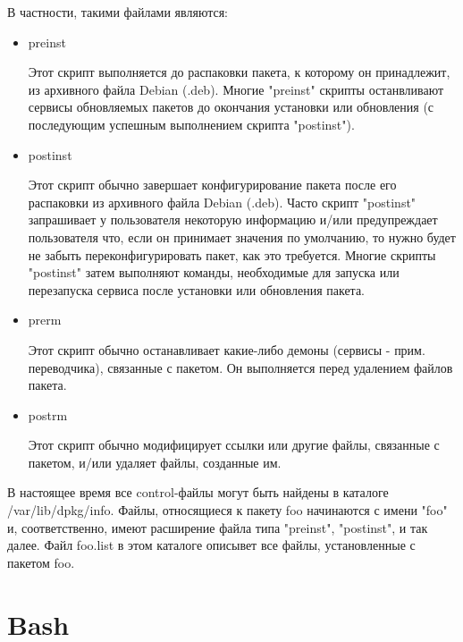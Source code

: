 \documentclass[12pt,a4paper]{article}
\begin{document}
В частности, такими файлами являются:
\begin{itemize}
  \item preinst
  
  Этот скрипт выполняется до распаковки пакета, к которому он принадлежит, из архивного файла Debian (.deb). Многие "preinst" скрипты останвливают сервисы обновляемых пакетов до окончания установки или обновления (с последующим успешным выполнением скрипта "postinst").
  \item postinst
  
  Этот скрипт обычно завершает конфигурирование пакета после его распаковки из архивного файла Debian (.deb). Часто скрипт "postinst" запрашивает у пользователя некоторую информацию и/или предупреждает пользователя что, если он принимает значения по умолчанию, то нужно будет не забыть переконфигурировать пакет, как это требуется. Многие скрипты "postinst" затем выполняют команды, необходимые для запуска или перезапуска сервиса после установки или обновления пакета.
  \item prerm
  
  Этот скрипт обычно останавливает какие-либо демоны (сервисы - прим. переводчика), связанные с пакетом. Он выполняется перед удалением файлов пакета.
  \item postrm
  
  Этот скрипт обычно модифицирует ссылки или другие файлы, связанные с пакетом, и/или удаляет файлы, созданные им.
\end{itemize}
В настоящее время все control-файлы могут быть найдены в каталоге /var/lib/dpkg/info. Файлы, относящиеся к пакету foo начинаются с имени "foo" и, соответственно, имеют расширение файла типа "preinst", "postinst", и так далее. Файл foo.list в этом каталоге описывет все файлы, установленные с пакетом foo.
\section{Bash}
\end{document}
